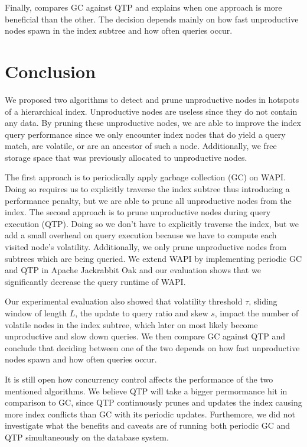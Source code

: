\documentclass[abstracton,12pt]{scrartcl}
\theoremstyle{definition}
\begin{document}
Finally,  compares GC against QTP and explains when
one approach is more beneficial than the other. The decision depends
mainly on how fast unproductive nodes spawn in the index subtree and
how often queries occur.

\newpage

\section{Conclusion}

We proposed two algorithms to detect and prune unproductive nodes in hotspots of a
hierarchical index. Unproductive nodes are useless since they do not contain any data.
By pruning these unproductive nodes, we are able to improve the
index query performance since we only encounter index nodes that do yield a
query match, are volatile, or are an ancestor of such a node.
Additionally, we free storage space that was previously allocated to unproductive nodes.

The first approach is to periodically apply garbage collection (GC) on WAPI. Doing so
requires us to explicitly traverse the index subtree thus introducing a performance penalty,
but we are able to prune all unproductive nodes from the index.
The second approach is to prune unproductive nodes during query execution (QTP). Doing so we
don't have to explicitly traverse the index, but we add a small overhead on query execution
because we have to compute each visited node's volatility.
Additionally, we only prune unproductive nodes from subtrees which are being queried.
We extend WAPI by implementing periodic GC and QTP in Apache Jackrabbit Oak
and our evaluation shows that we significantly decrease the query runtime of WAPI.

Our experimental evaluation also showed that volatility threshold $\tau$, sliding
window of length $L$, the update to query ratio and skew $s$, impact the number
of volatile nodes in the index subtree, which later on most likely become
unproductive and slow down queries. We then compare GC against QTP and conclude
that deciding between one of the two depends on how fast unproductive nodes spawn
and how often queries occur.

It is still open how concurrency control affects the performance of the two mentioned
algorithms. We believe QTP will take a bigger permormance hit in comparison to GC, since
QTP continuously prunes and updates the index causing more index conflicts than
GC with its periodic updates. Furthemore, we did not investigate what the benefits and caveats
are of running both periodic GC and QTP simultaneously on the database system.
\end{document}
